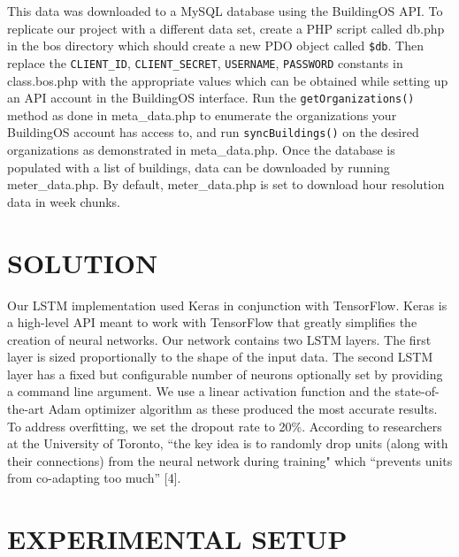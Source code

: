 \documentclass[letterpaper, 11 pt, conference]{ieeeconf}  %
\begin{document}
This data was downloaded to a MySQL database using the BuildingOS API. To replicate our project with a different data set, create a PHP script called db.php in the bos directory which should create a new PDO object called \texttt{\$db}. Then replace the \texttt{CLIENT\_ID}, \texttt{CLIENT\_SECRET}, \texttt{USERNAME}, \texttt{PASSWORD} constants in class.bos.php with the appropriate values which can be obtained while setting up an API account in the BuildingOS interface. Run the \texttt{getOrganizations()} method as done in meta\_data.php to enumerate the organizations your BuildingOS account has access to, and run \texttt{syncBuildings()} on the desired organizations as demonstrated in meta\_data.php. Once the database is populated with a list of buildings, data can be downloaded by running meter\_data.php. By default, meter\_data.php is set to download hour resolution data in week chunks.

\section{SOLUTION}

Our LSTM implementation used Keras in conjunction with TensorFlow. Keras is a high-level API meant to work with TensorFlow that greatly simplifies the creation of neural networks. Our network contains two LSTM layers. The first layer is sized proportionally to the shape of the input data. The second LSTM layer has a fixed but configurable number of neurons optionally set by providing a command line argument. We use a linear activation function and the state-of-the-art Adam optimizer algorithm as these produced the most accurate results. To address overfitting, we set the dropout rate to 20\%. According to researchers at the University of Toronto, “the key idea is to randomly drop units (along with their connections) from the neural network during training" which “prevents units from co-adapting too much” [4]. 


\section{EXPERIMENTAL SETUP}
\end{document}
